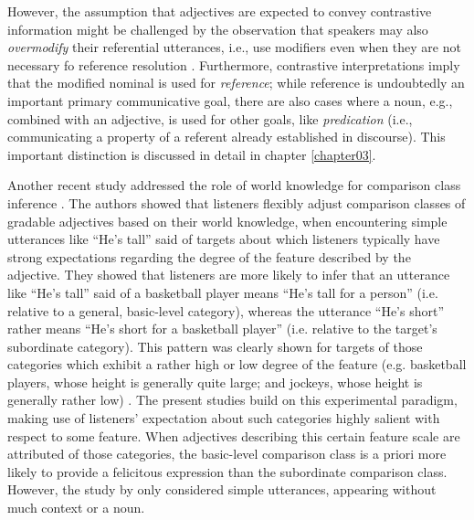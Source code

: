 However, the assumption that adjectives are expected to convey contrastive information might be challenged by the observation that speakers may also \textit{overmodify} their referential utterances, i.e., use modifiers even when they are not necessary fo reference resolution \parencite{degen2020redundancy}.  Furthermore, contrastive interpretations imply that the modified nominal is used for \textit{reference}; while reference is undoubtedly an important primary communicative goal, there are also cases where a noun, e.g., combined with an adjective, is used for other goals, like \textit{predication} (i.e., communicating a property of a referent already established in discourse). This important distinction is discussed in detail in chapter \ref{chapter03}.  

Another recent study addressed the role of world knowledge for comparison class inference \parencite{tessler2017warm}. The authors showed that listeners flexibly adjust comparison classes of gradable adjectives based on their world knowledge, when encountering simple utterances like “He’s tall” said of targets about which listeners typically have strong expectations regarding the degree of the feature described by the adjective. They showed that listeners are more likely to infer that an utterance like “He’s tall” said of a basketball player means “He’s tall for a person” (i.e. relative to a general, basic-level category), whereas the utterance “He’s short” rather means “He’s short for a basketball player” (i.e. relative to the target’s subordinate category). This pattern was clearly shown for targets of those categories which exhibit a rather high or low degree of the feature (e.g. basketball players, whose height is generally quite large; and jockeys, whose height is generally rather low) \parencite{tessler2017warm}. 
The present studies build on this experimental paradigm, making use of listeners’ expectation about such categories highly salient with respect to some feature. When adjectives describing this certain feature scale are attributed of those categories, the basic-level comparison class is a priori more likely to provide a felicitous expression than the subordinate comparison class. 
However, the study by \textcite{tessler2017warm} only considered simple utterances, appearing without much context or a noun. 
